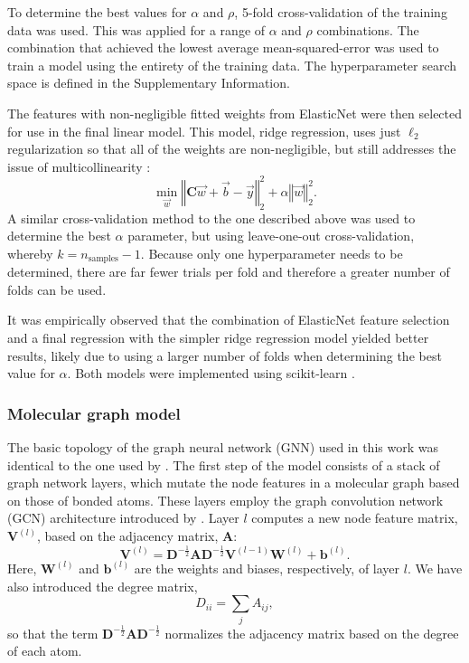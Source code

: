 To determine the best values for $\alpha$ and $\rho$, 5-fold cross-validation of
the training data was used. This was applied for a range of $\alpha$ and $\rho$
combinations. The combination that achieved the lowest average
mean-squared-error was used to train a model using the entirety of the training
data. The hyperparameter search space is defined in the Supplementary
Information.

The features with non-negligible fitted weights from ElasticNet were then
selected for use in the final linear model. This model, ridge regression, uses
just $\ell_2$ regularization so that all of the weights are non-negligible, but
still addresses the issue of multicollinearity
\cite{mcdonaldRidgeRegression2009}:
\begin{equation}
    \min_{\vec{w}} \left \Vert \mathbf{C} \vec{w} + \vec{b} - \vec{y} \right \Vert_2^2 + \alpha \left \Vert \vec{w}\right \Vert_2^2.
\end{equation}
A similar cross-validation method to the one described above was used to
determine the best $\alpha$ parameter, but using leave-one-out cross-validation,
whereby $k=n_\text{samples}-1$. Because only one hyperparameter needs to be
determined, there are far fewer trials per fold and therefore a greater number
of folds can be used.

It was empirically observed that the combination of ElasticNet feature selection
and a final regression with the simpler ridge regression model yielded better
results, likely due to using a larger number of folds when determining the best
value for $\alpha$. Both models were implemented using scikit-learn
\cite{pedregosaScikitlearnMachineLearning2011}.

\subsubsection{Molecular graph model}

The basic topology of the graph neural network (GNN) used in this work was
identical to the one used by \citet{qinPredictingCriticalMicelle2021}. The first
step of the model consists of a stack of graph network layers, which mutate the
node features in a molecular graph based on those of bonded atoms. These layers
employ the graph convolution network (GCN) architecture introduced by
\citet{kipfSemiSupervisedClassificationGraph2017}. Layer $l$ computes a new node
feature matrix, $\mathbf{V}^{(l)}$, based on the adjacency matrix, $\mathbf{A}$:
\begin{equation}
    \mathbf{V}^{(l)} = \mathbf{D}^{-\frac{1}{2}} \mathbf{A} \mathbf{D}^{-\frac{1}{2}} \mathbf{V}^{(l-1)} \mathbf{W}^{(l)} + \mathbf{b}^{(l)}.
\end{equation}
Here, $\mathbf{W}^{(l)}$ and $\mathbf{b}^{(l)}$ are the weights and biases,
respectively, of layer $l$. We have also introduced the degree matrix,
\begin{equation}
    D_{ii} = \sum_j A_{ij},
\end{equation}
so that the term $\mathbf{D}^{-\frac{1}{2}} \mathbf{A} \mathbf{D}^{-\frac{1}{2}}$ normalizes the
    adjacency matrix based on the degree of each atom.

